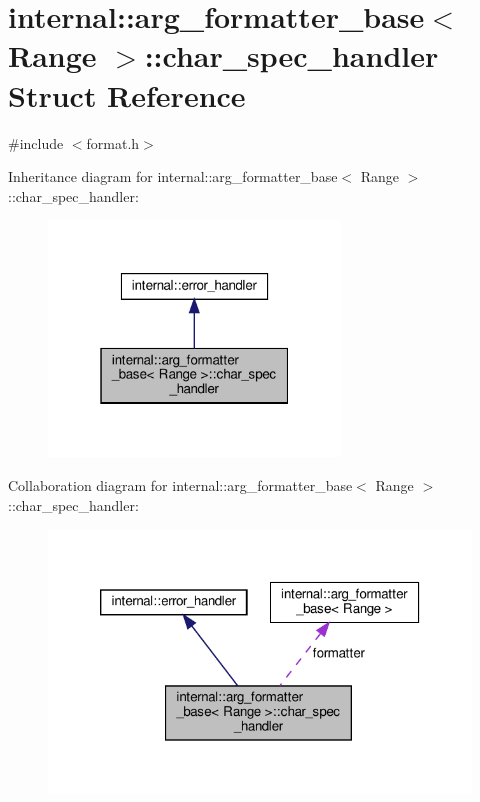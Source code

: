 \hypertarget{structinternal_1_1arg__formatter__base_1_1char__spec__handler}{}\section{internal\+:\+:arg\+\_\+formatter\+\_\+base$<$ Range $>$\+:\+:char\+\_\+spec\+\_\+handler Struct Reference}
\label{structinternal_1_1arg__formatter__base_1_1char__spec__handler}


{\ttfamily \#include $<$format.\+h$>$}



Inheritance diagram for internal\+:\+:arg\+\_\+formatter\+\_\+base$<$ Range $>$\+:\+:char\+\_\+spec\+\_\+handler\+:
\nopagebreak
\begin{figure}[H]
\begin{center}
\leavevmode
\includegraphics[width=220pt]{structinternal_1_1arg__formatter__base_1_1char__spec__handler__inherit__graph}
\end{center}
\end{figure}


Collaboration diagram for internal\+:\+:arg\+\_\+formatter\+\_\+base$<$ Range $>$\+:\+:char\+\_\+spec\+\_\+handler\+:
\nopagebreak
\begin{figure}[H]
\begin{center}
\leavevmode
\includegraphics[width=320pt]{structinternal_1_1arg__formatter__base_1_1char__spec__handler__coll__graph}
\end{center}
\end{figure}
